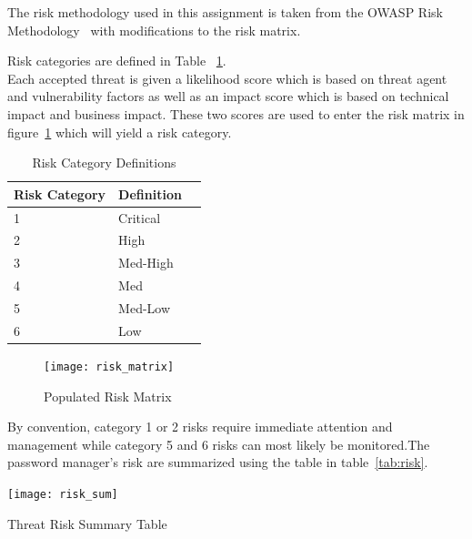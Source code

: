 
The risk methodology used in this assignment is taken from the OWASP Risk
Methodology~\cite{owasprisk} with modifications to the risk matrix.





Risk categories are defined in Table ~\ref{tab:risk_cat}.\\


Each accepted threat is given a likelihood score which is based on threat agent and vulnerability factors as well as an impact score which is based on technical impact and business impact.  These two scores are used to enter the risk matrix in figure~\ref{fig:riskmatrix} which will yield a risk category.

\begin{table}[h]
    \centering
    \begin{tabular}{l l l }
    \hline
    Risk Category & Definition \\
    \hline
    1 & Critical\\
    2 & High\\
    3 & Med-High\\
    4 & Med\\
    5 & Med-Low\\
    6 & Low \\
    \end{tabular}
    \caption{Risk Category Definitions}
    \label{tab:risk_cat}
\end{table}

\begin{figure}[]
    \centering
    \texttt{[image: risk\_matrix]}
    \caption{Populated Risk Matrix}
    \label{fig:riskmatrix}
\end{figure}

By convention, category 1 or 2 risks require immediate attention and management
while category 5 and 6 risks can most likely be monitored.The password manager's risk are summarized using the table in table~\ref{tab:risk}.

\begin{table}
    \centering
    \texttt{[image: risk\_sum]}
    \caption{Threat Risk Summary Table}
    \label{fig:risksum}
\end{table}

